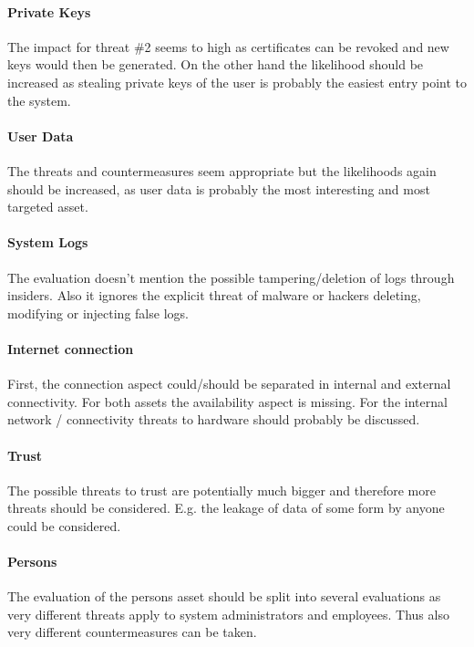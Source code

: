 \documentclass[english]{article}
\begin{document}
\paragraph{Private Keys}
The impact for threat \#2 seems to high as certificates can be revoked and new keys would then be generated. On the other hand the likelihood should be increased as stealing private keys of the user is probably the easiest entry point to the system.  

\paragraph{User Data}
The threats and countermeasures seem appropriate but the likelihoods again should be increased, as user data is probably the most interesting and most targeted asset.

\paragraph{System Logs} 
The evaluation doesn't mention the possible tampering/deletion of logs through insiders. Also it ignores the explicit threat of malware or hackers deleting, modifying or injecting false logs. 

\paragraph{Internet connection} 
First, the connection aspect could/should be separated in internal and external connectivity. For both assets the availability aspect is missing. For the internal network / connectivity threats to hardware should probably be discussed.

\paragraph{Trust} 
The possible threats to trust are potentially much bigger and therefore more threats should be considered. E.g. the leakage of data of some form by anyone could be considered.

\paragraph{Persons}
The evaluation of the persons asset should be split into several evaluations as very different threats apply to system administrators and employees. Thus also very different countermeasures can be taken.
\\
\end{document}
